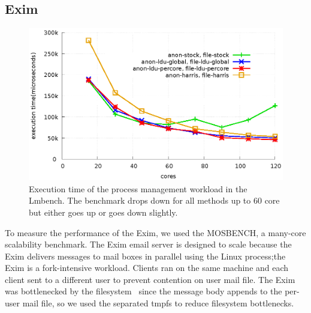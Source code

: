 \subsection{Exim}

\begin{figure}[tb]
  \begin{center}
    \includegraphics[scale=0.8]{graph/lmbench.eps}
  \end{center}
  \caption{Execution time of the process management workload in the Lmbench. 
  The benchmark drops down for all methods up to 60 core but either goes up or 
  goes down slightly.}
  \label{fig:MicroBench}
\end{figure}

To measure the performance of the Exim, we used the MOSBENCH, a many-core
scalability benchmark.
The Exim email server is designed to scale because the Exim delivers messages to
mail boxes in parallel using the Linux process;the Exim is a fork-intensive
workload.
Clients ran on the same machine and each client sent to a different user to
prevent contention on user mail file.
The Exim was bottlenecked by the filesystem~\cite{SilasBoydWickizer2010LinuxScales48} since the message body appends to
the per-user mail file, so we used the separated tmpfs to reduce filesystem
bottlenecks.

